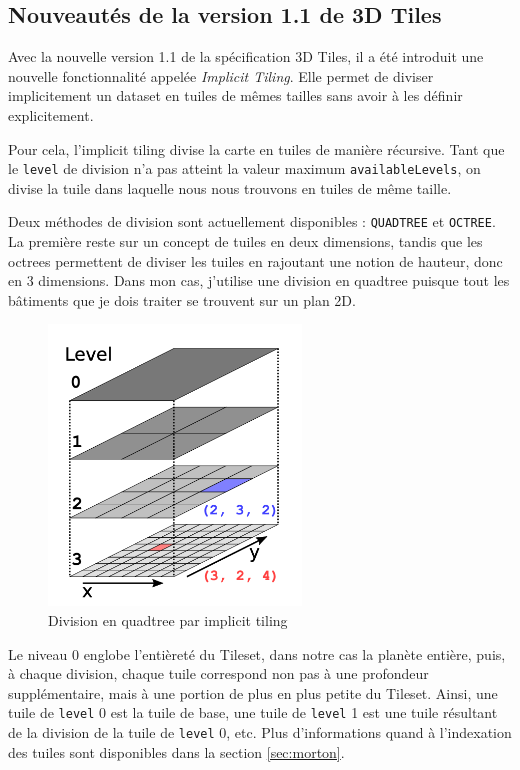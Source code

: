 \subsection{Nouveautés de la version 1.1 de 3D Tiles}

Avec la nouvelle version 1.1 de la spécification 3D Tiles, il a été introduit une nouvelle fonctionnalité appelée \textit{Implicit Tiling}. Elle permet de diviser implicitement un dataset en tuiles de mêmes tailles sans avoir à les définir explicitement.

Pour cela, l'implicit tiling divise la carte en tuiles de manière récursive. Tant que le \texttt{level} de division n'a pas atteint la valeur maximum \texttt{availableLevels}, on divise la tuile dans laquelle nous nous trouvons en tuiles de même taille.

Deux méthodes de division sont actuellement disponibles : \texttt{QUADTREE} et \texttt{OCTREE}. La première reste sur un concept de tuiles en deux dimensions, tandis que les octrees permettent de diviser les tuiles en rajoutant une notion de hauteur, donc en 3 dimensions. Dans mon cas, j'utilise une division en quadtree puisque tout les bâtiments que je dois traiter se trouvent sur un plan 2D.

\begin{figure}[H]
    \centering
    \includegraphics[width=0.6\textwidth]{assets/figures/implicit-tiling-small.png}
    \caption{Division en quadtree par implicit tiling \cite{3d-tiles-specification}}
    \label{fig:implicit-tiling}
\end{figure}

Le niveau 0 englobe l'entièreté du Tileset, dans notre cas la planète entière, puis, à chaque division, chaque tuile correspond non pas à une profondeur supplémentaire, mais à une portion de plus en plus petite du Tileset. Ainsi, une tuile de \texttt{level} 0 est la tuile de base, une tuile de \texttt{level} 1 est une tuile résultant de la division de la tuile de \texttt{level} 0, etc. Plus d'informations quand à l'indexation des tuiles sont disponibles dans la section \ref{sec:morton}.

